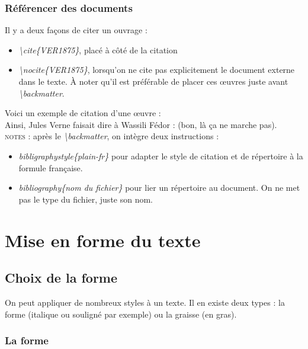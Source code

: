\documentclass[a4paper, 10pt]{book}
\begin{document}
\subsection{Référencer des documents}
Il y a deux façons de citer un ouvrage :
\begin{itemize}
\item \textit{\textbackslash cite\{VER1875\}},  placé à côté de la citation
\item \textit{\textbackslash nocite\{VER1875\}}, lorsqu'on ne cite pas explicitement le document externe dans le texte. À noter qu'il est préférable de placer ces \oe uvres juste avant \textit{\textbackslash backmatter}.\\ 
\end{itemize}
Voici un exemple de citation d'une \oe uvre :\\ 
Ainsi, Jules Verne faisait dire à Wassili Fédor \cite{VER1875} : (bon, là ça ne marche pas).
\\ 
\textsc{notes :} après le \textit{\textbackslash backmatter}, on intègre deux instructions :

\begin{itemize}
\item \textit{bibligraphystyle\{plain-fr\}} pour adapter le style de citation et de répertoire à la formule française.
\item \textit{bibliography\{nom du fichier\}} pour lier un répertoire au document. On ne met pas le type du fichier, juste son nom.
\end{itemize}

\chapter{Mise en forme du texte}
\section{Choix de la forme}
On peut appliquer de nombreux styles à un texte. Il en existe deux types : la forme (italique ou souligné par exemple) ou la graisse (en gras).

\subsection{La forme}
\end{document}
